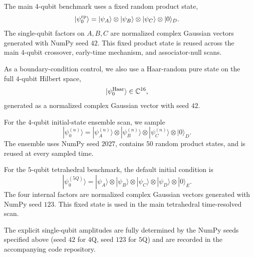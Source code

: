 \documentclass[aps,physrev,preprint,groupedaddress]{revtex4-2}
\begin{document}
The main 4-qubit benchmark uses a fixed random product state,
\begin{equation}
    |\psi_0^{\rm rp}\rangle = |\psi_A\rangle\otimes|\psi_B\rangle\otimes|\psi_C\rangle \otimes |0\rangle_D.
\end{equation}
The single-qubit factors on $A,B,C$ are normalized complex Gaussian vectors generated with NumPy seed $42$. This fixed product state is reused across the main $4$-qubit crossover, early-time mechanism, and associator-null scans.

As a boundary-condition control, we also use a Haar-random pure state on the full $4$-qubit Hilbert space,
\begin{equation}
    |\psi_0^{\rm Haar}\rangle\in \mathbb C^{16},
\end{equation}
generated as a normalized complex Gaussian vector with seed $42$.

For the $4$-qubit initial-state ensemble scan, we sample
\begin{equation}
    |\psi_0^{(n)}\rangle = |\psi_A^{(n)}\rangle \otimes|\psi_B^{(n)}\rangle \otimes|\psi_C^{(n)}\rangle \otimes|0\rangle_D .
\end{equation}
The ensemble uses NumPy seed $2027$, contains $50$ random product states, and is reused at every sampled time.

For the $5$-qubit tetrahedral benchmark, the default initial condition is
\begin{equation}
    |\psi_0^{(5Q)}\rangle = |\psi_A\rangle\otimes|\psi_B\rangle\otimes|\psi_C\rangle \otimes|\psi_D\rangle\otimes|0\rangle_E.
\end{equation}
The four internal factors are normalized complex Gaussian vectors generated with NumPy seed $123$. This fixed state is used in the main tetrahedral time-resolved scan.

The explicit single-qubit amplitudes are fully determined by the NumPy seeds specified above (seed $42$ for $4$Q, seed $123$ for $5$Q) and are recorded in the accompanying code repository.
\end{document}
